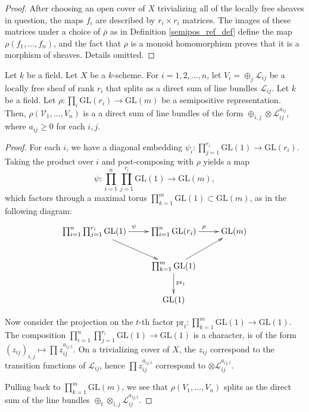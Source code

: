 \begin{proof}
After choosing an open cover of $X$ trivializing all of the locally free sheaves in question, the maps $f_i$ are described by $r_i\times r_i$ matrices. The images of these matrices under a choice of $\overline{\rho}$ as in Definition \ref{semipos_ref_def} define the map $\rho(f_1,\ldots,f_n)$, and the fact that $\rho$ is a monoid homomorphism proves that it is a morphism of sheaves. Details omitted.
\end{proof}








\begin{lemma}\label{rho_of_split_bundle}
Let $k$ be a field.
Let $X$ be a $k$-scheme.
For $i=1,2,\ldots,n$, let $V_i=\oplus_{j}\mathcal{L}_{ij}$ be a locally free sheaf of rank $r_i$ that splits as a direct sum of line bundles $\mathcal{L}_{ij}$.
Let $k$ be a field.
Let $\rho:\prod_{i}\mathrm{GL}(r_i)\to \mathrm{GL}(m)$ be a semipositive representation. 
Then, $\rho(\mathcal{V}_1,\ldots,V_n)$ is a a direct sum of line bundles of the form $\oplus_{i,j}\otimes\mathcal{L}_{ij}^{a_{ij}}$, where $a_{ij}\ge0$ for each $i,j$.
\end{lemma}

\begin{proof}
For each $i$, we have a diagonal embedding $\psi_i:\prod_{j=1}^{r_i}\mathrm{GL}(1)\to \mathrm{GL}(r_i)$.
Taking the product over $i$ and post-composing with $\rho$ yields a map
$$
\psi:\prod_{i=1}^{n}\prod_{j=1}^{r_i}\mathrm{GL}(1)\to \mathrm{GL}(m),
$$
which factors through a maximal torus $\prod_{k=1}^{m}\mathrm{GL}(1)\subset \mathrm{GL}(m)$, as in the following diagram:
$$
\xymatrix{
\prod_{i=1}^{n}\prod_{j=1}^{r_i} \mathrm{GL}(1)\ar[r]^{\psi} \ar[rd] &\prod_{i=1}^{n}\mathrm{GL}(r_i)\ar[r]^{\rho} &\mathrm{GL}(m)\\
&\prod_{k=1}^{m}\mathrm{GL}(1)\ar[ru]\ar[d]^{\mathrm{pr}_t}&\\
&\mathrm{GL}(1)&
}
$$


Now consider the projection on the $t$-th factor $\mathrm{pr}_t:\prod_{k=1}^m\mathrm{GL}(1)\to \mathrm{GL}(1)$. The composition $\prod_{i=1}^n\prod_{j=1}^{r_i} \mathrm{GL}(1)\to \mathrm{GL}(1)$ is a character, is of the form $(z_{ij})_{i,j}\mapsto \prod z_{ij}^{a_{ij,t}}$. On a trivializing cover of $X$, the $z_{ij}$ correspond to the transition functions of $\mathcal{L}_{ij}$, hence $\prod z_{ij}^{a_{ij,t}}$ correspond to $\otimes\mathcal{L}_{ij}^{a_{ij,t}}$.

Pulling back to $\prod_{k=1}^{m} \mathrm{GL}(m)$, we see that $\rho(V_1,\ldots,V_n)$ splits as the direct sum of the line bundles $\oplus_t \otimes_{i,j}\mathcal{L}_{ij}^{a_{ij,t}}$.
\end{proof}

